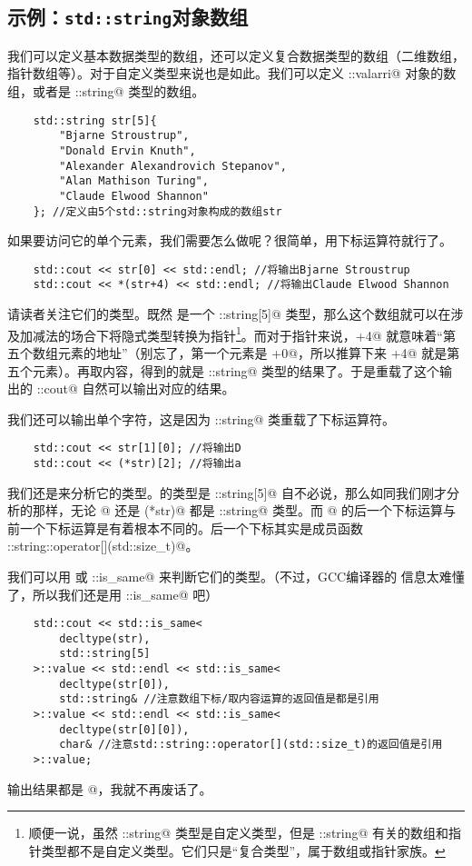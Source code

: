 \subsection*{示例：\texttt{std::string}对象数组}
我们可以定义基本数据类型的数组，还可以定义复合数据类型的数组（二维数组，指针数组等）。对于自定义类型来说也是如此。我们可以定义 \lstinline@std::valarri@ 对象的数组，或者是 \lstinline@std::string@ 类型的数组。\par
\begin{lstlisting}
    std::string str[5]{
        "Bjarne Stroustrup",
        "Donald Ervin Knuth",
        "Alexander Alexandrovich Stepanov",
        "Alan Mathison Turing",
        "Claude Elwood Shannon"
    }; //定义由5个std::string对象构成的数组str
\end{lstlisting}
如果要访问它的单个元素，我们需要怎么做呢？很简单，用下标运算符就行了。
\begin{lstlisting}
    std::cout << str[0] << std::endl; //将输出Bjarne Stroustrup
    std::cout << *(str+4) << std::endl; //将输出Claude Elwood Shannon
\end{lstlisting}
请读者关注它们的类型。既然 \lstinline@str@ 是一个 \lstinline@std::string[5]@ 类型，那么这个数组就可以在涉及加减法的场合下将隐式类型转换为指针\footnote{顺便一说，虽然 \lstinline@std::string@ 类型是自定义类型，但是 \lstinline@std::string@ 有关的数组和指针类型都不是自定义类型。它们只是``复合类型''，属于数组或指针家族。}。而对于指针来说，\lstinline@str+4@ 就意味着``第五个数组元素的地址''（别忘了，第一个元素是 \lstinline@str+0@，所以推算下来 \lstinline@str+4@ 就是第五个元素）。再取内容，得到的就是 \lstinline@std::string@ 类型的结果了。于是重载了这个输出的 \lstinline@std::cout@ 自然可以输出对应的结果。\par
我们还可以输出单个字符，这是因为 \lstinline@std::string@ 类重载了下标运算符。
\begin{lstlisting}
    std::cout << str[1][0]; //将输出D
    std::cout << (*str)[2]; //将输出a
\end{lstlisting}
我们还是来分析它的类型。\lstinline@str@ 的类型是 \lstinline@std::string[5]@ 自不必说，那么如同我们刚才分析的那样，无论 \lstinline@str[1]@ 还是 \lstinline@(*str)@ 都是 \lstinline@std::string@ 类型。而 \lstinline@str[1][0]@ 的后一个下标运算与前一个下标运算是有着根本不同的。后一个下标其实是成员函数 \lstinline@std::string::operator[](std::size_t)@。\par
我们可以用 \lstinline@typeid@ 或 \lstinline@std::is_same@ 来判断它们的类型。（不过，GCC编译器的 \lstinline@typeid@ 信息太难懂了，所以我们还是用 \lstinline@std::is_same@ 吧）
\begin{lstlisting}
    std::cout << std::is_same<
        decltype(str),
        std::string[5]
    >::value << std::endl << std::is_same<
        decltype(str[0]),
        std::string& //注意数组下标/取内容运算的返回值是都是引用
    >::value << std::endl << std::is_same<
        decltype(str[0][0]),
        char& //注意std::string::operator[](std::size_t)的返回值是引用
    >::value;
\end{lstlisting}
输出结果都是 @，我就不再废话了。\par
